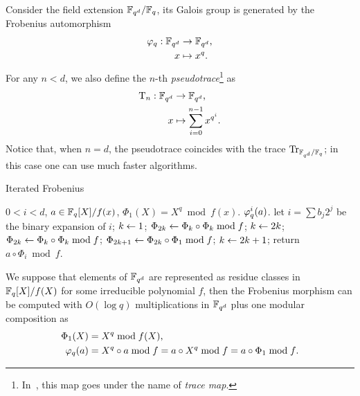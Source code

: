 Consider the field extension $\mathbb{F}_{q^d}/\mathbb{F}_q$, its Galois group is
generated by the Frobenius automorphism
\begin{equation}
  \label{eq:199}
  \begin{aligned}
  \varphi_q : \mathbb{F}_{q^d}&\rightarrow\mathbb{F}_{q^d}\text{,}\\
  x &\mapsto x^{q}\text{.}
  \end{aligned}
\end{equation}
For any $n<d$, we also define the $n$-th
\textit{pseudotrace}\footnote{In~\cite{vzgathen+shoup92},
  this map goes under the name of \emph{trace map}.}
as
\begin{equation}
  \label{eq:202}
  \begin{aligned}
    \operatorname{T}_n : \mathbb{F}_{q^d}&\rightarrow\mathbb{F}_{q^d}\text{,}\\
    x&\mapsto\sum_{i=0}^{n-1} x^{q^i}\text{.}
  \end{aligned}
\end{equation}
Notice that, when $n=d$, the pseudotrace coincides with the trace
$\operatorname{Tr}_{\mathbb{F}_{q^d}/\mathbb{F}_q}$; in this case one can use much faster
algorithms.


\begin{algorithm}
  \caption{\label{alg:itfrob}Iterated Frobenius}
  \begin{algorithmic}[1]
    \REQUIRE $0<i<d$, $a\in\mathbb{F}_q[X]/f(x)$, $\Phi_1(X) = X^q\bmod f(x)$.
    \ENSURE $\varphi_q^i(a)$.
    \STATE let $i=\sum b_j2^j$ be the binary expansion of $i$;
    \STATE $k \leftarrow 1$;
    \STATE $\Phi_{2k} \leftarrow \Phi_k\circ\Phi_k \bmod f$;
    \STATE $k \leftarrow 2k$;
    \ELSE
    \STATE $\Phi_{2k} \leftarrow \Phi_k\circ\Phi_k \bmod f$;
    \STATE $\Phi_{2k+1} \leftarrow \Phi_{2k}\circ\Phi_1 \bmod f$;
    \STATE $k \leftarrow 2k +1$;
    \ENDIF
    \ENDFOR
    \STATE return $a\circ\Phi_i \bmod f$.
  \end{algorithmic}
\end{algorithm}

We suppose that elements of $\mathbb{F}_{q^d}$ are represented as residue
classes in $\mathbb{F}_q[X]/f(X)$ for some irreducible polynomial $f$, then
the Frobenius morphism can be computed with $O(\log q)$
multiplications in $\mathbb{F}_{q^d}$ plus one modular composition as
\begin{align}
  \label{eq:203}
  \Phi_1(X) &= X^q \bmod f(X)\text{,}\\
  \varphi_q(a) &= X^q\circ a\bmod f = a\circ X^q\bmod f = a\circ \Phi_1\bmod f
  \text{.}
\end{align}


